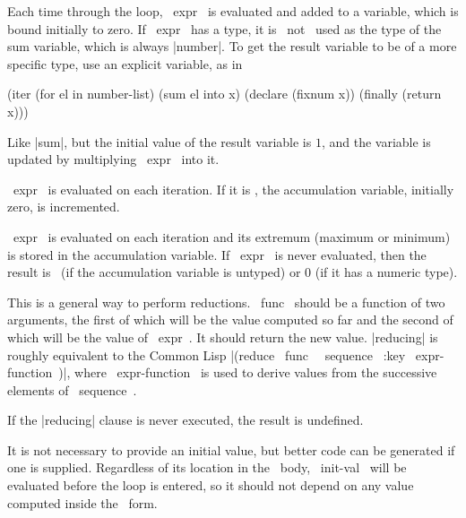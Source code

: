 \begin{clauses}

Each time through the loop, ~expr~ is evaluated and added to a
variable, which is bound initially to zero.  If ~expr~ has a type,
it is ~not~ used as the type of the sum variable, which is always
|number|.  To get the result variable to be of a more specific
type, use an explicit variable, as in
\begin{program}
(iter (for el in number-list)
      (sum el into x)
      (declare (fixnum x))
      (finally (return x)))
\end{program}

Like |sum|, but the initial value of the result variable is $1$,
and the variable is updated by multiplying ~expr~ into it.

~expr~ is evaluated on each iteration.  If it is \nonnil, the
accumulation variable, initially zero, is incremented.

\startitem
{}
\finishitem
~expr~ is evaluated on each iteration and its extremum (maximum or
minimum) is stored in the accumulation variable.  If ~expr~ is never
evaluated, then the result is \nil\ (if the accumulation variable is
untyped) or $0$ (if it has a numeric type).

This is a general way to perform reductions. ~func~ should be a
function of two arguments, the first of which will be the value
computed so far and
the second of which will be the value of ~expr~.  It should return the
new value.
|reducing| is roughly equivalent to the
Common Lisp |(reduce ~func~ ~sequence~ :key ~expr-function~)|, where
~expr-function~ is used to derive values from the successive elements
of ~sequence~.

\cpar If the |reducing| clause is never executed, the result is
undefined.

\cpar It is not necessary to provide an
initial value, but better code can be generated if one is supplied.
Regardless of its location in the \iter\ body, ~init-val~ will be
evaluated before the loop is entered, so it should not depend on any
value computed inside the \iter\ form.


\end{clauses}

